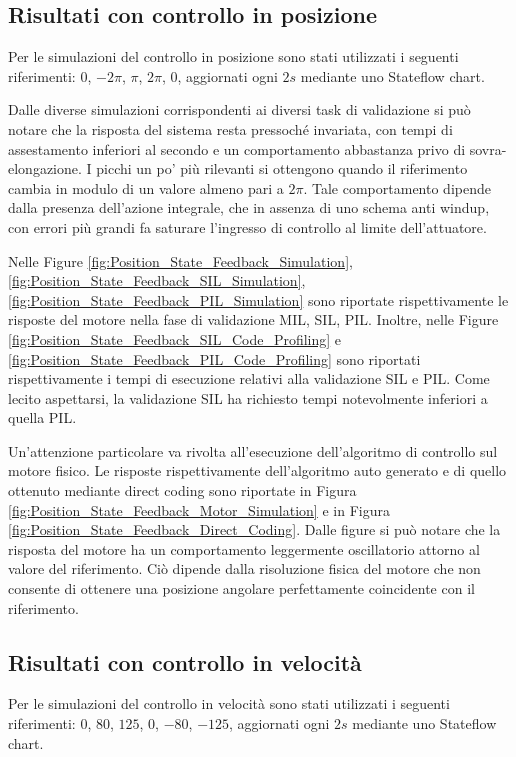 \documentclass[11pt,a4paper,oneside]{extarticle}
\begin{document}
\subsection{Risultati con controllo in posizione}
Per le simulazioni del controllo in posizione sono stati utilizzati i seguenti riferimenti: $0$, $-2\pi$, $\pi$, $2\pi$, $0$, aggiornati ogni $2s$ mediante uno Stateflow chart.\bigskip

Dalle diverse simulazioni corrispondenti ai diversi task di validazione si può notare che la risposta del sistema resta pressoché invariata, con tempi di assestamento inferiori al secondo e un comportamento abbastanza privo di sovra-elongazione. I picchi un po' più rilevanti si ottengono quando il riferimento cambia in modulo di un valore almeno pari a $2\pi$. Tale comportamento dipende dalla presenza dell'azione integrale, che in assenza di uno schema anti windup, con errori più grandi fa saturare l'ingresso di controllo al limite dell'attuatore.\bigskip

Nelle Figure \ref{fig:Position_State_Feedback_Simulation}, \ref{fig:Position_State_Feedback_SIL_Simulation}, \ref{fig:Position_State_Feedback_PIL_Simulation} sono riportate rispettivamente le risposte del motore nella fase di validazione MIL, SIL, PIL. Inoltre, nelle Figure \ref{fig:Position_State_Feedback_SIL_Code_Profiling} e \ref{fig:Position_State_Feedback_PIL_Code_Profiling} sono riportati rispettivamente i tempi di esecuzione relativi alla validazione SIL e PIL. Come lecito aspettarsi, la validazione SIL ha richiesto tempi notevolmente inferiori a quella PIL.\bigskip

Un'attenzione particolare va rivolta all'esecuzione dell'algoritmo di controllo sul motore fisico. Le risposte rispettivamente dell'algoritmo auto generato e di quello ottenuto mediante direct coding sono riportate in Figura \ref{fig:Position_State_Feedback_Motor_Simulation} e in Figura \ref{fig:Position_State_Feedback_Direct_Coding}. Dalle figure si può notare che la risposta del motore ha un comportamento leggermente oscillatorio attorno al valore del riferimento. Ciò dipende dalla risoluzione fisica del motore che non consente di ottenere una posizione angolare perfettamente coincidente con il riferimento.


\subsection{Risultati con controllo in velocità}
Per le simulazioni del controllo in velocità sono stati utilizzati i seguenti riferimenti: $0$, $80$, $125$, $0$, $-80$, $-125$, aggiornati ogni $2s$ mediante uno Stateflow chart.\bigskip
\end{document}
